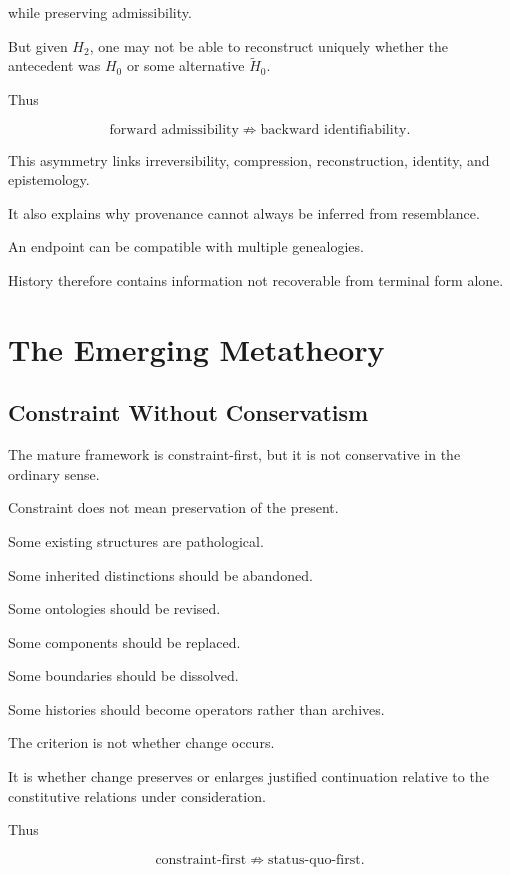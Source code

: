 \documentclass[11pt]{article}
\theoremstyle{remark}
\begin{document}
while preserving admissibility.

But given $H_2$, one may not be able to reconstruct uniquely whether the antecedent was $H_0$ or some alternative $\tilde{H}_0$.

Thus

\begin{equation}
\text{forward admissibility}
\not\Rightarrow
\text{backward identifiability}.
\end{equation}

This asymmetry links irreversibility, compression, reconstruction, identity, and epistemology.

It also explains why provenance cannot always be inferred from resemblance.

An endpoint can be compatible with multiple genealogies.

History therefore contains information not recoverable from terminal form alone.

\section{The Emerging Metatheory}

\subsection{Constraint Without Conservatism}

The mature framework is constraint-first, but it is not conservative in the ordinary sense.

Constraint does not mean preservation of the present.

Some existing structures are pathological.

Some inherited distinctions should be abandoned.

Some ontologies should be revised.

Some components should be replaced.

Some boundaries should be dissolved.

Some histories should become operators rather than archives.

The criterion is not whether change occurs.

It is whether change preserves or enlarges justified continuation relative to the constitutive relations under consideration.

Thus

\begin{equation}
\text{constraint-first}
\not\Rightarrow
\text{status-quo-first}.
\end{equation}
\end{document}

